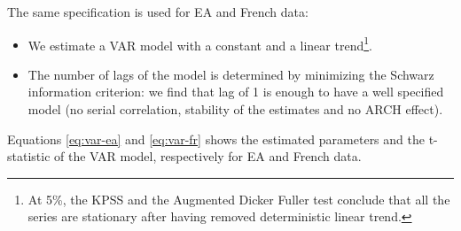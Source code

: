 \documentclass[
  11pt,
]{article}
\begin{document}
The same specification is used for EA and French data:

\begin{itemize}
\item
  We estimate a VAR model with a constant and a linear trend\footnote{
    At 5\%, the KPSS and the Augmented Dicker Fuller test conclude that all the series are stationary after having removed deterministic linear trend.}.
\item
  The number of lags of the model is determined by minimizing the Schwarz information criterion: we find that lag of 1 is enough to have a well specified model (no serial correlation, stability of the estimates and no ARCH effect).
\end{itemize}

Equations \eqref{eq:var-ea} and \eqref{eq:var-fr} shows the estimated parameters and the t-statistic of the VAR model, respectively for EA and French data.
\end{document}
